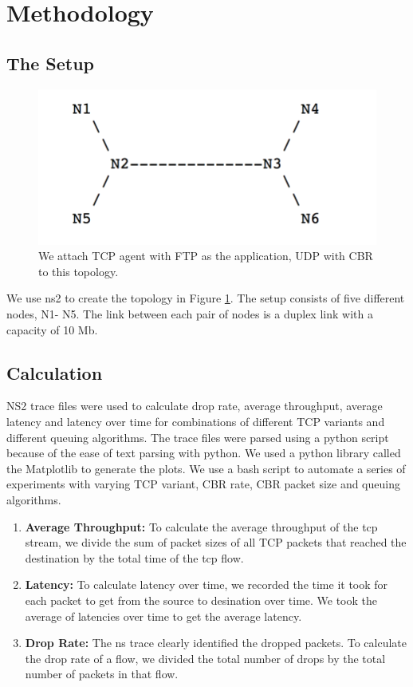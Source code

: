  \section{Methodology}\label{sec:methodology}
  \subsection{The Setup}
  \begin{figure}[!htbp]
  	\centering 
	\includegraphics[scale=0.4]{setup.png}
	\caption{We attach TCP agent with FTP as the application, UDP with CBR to this topology.}
	\label{fig:setup}
\end{figure}
We use ns2 to create the topology in Figure \ref{fig:setup}. The setup consists of five different nodes, N1- N5. The link between each pair of nodes is a duplex link with a capacity of 10 Mb.
\subsection{Calculation}
NS2 trace files were used to calculate drop rate, average throughput, average latency and latency over time for combinations of different TCP variants and different queuing algorithms. The trace files were parsed using a python script because of the ease of text parsing with python. We used a python library called the Matplotlib to generate the plots. We use a bash script to automate a series of experiments with varying TCP variant, CBR rate, CBR packet size and queuing algorithms. 
\begin{enumerate}
\item \textbf{Average Throughput:} To calculate the average throughput of the tcp stream, we divide the sum of packet sizes of all TCP packets that reached the destination by the  total time of the tcp flow. 
\item \textbf{Latency:} To calculate latency over time, we recorded the time it took for each packet to get from the source to desination over time. We took the average of latencies over time to get the average latency. 
\item \textbf{Drop Rate:} The ns trace clearly identified the dropped packets. To calculate the drop rate of a flow, we divided the total number of drops by the total number of packets in that flow.
\end{enumerate}
